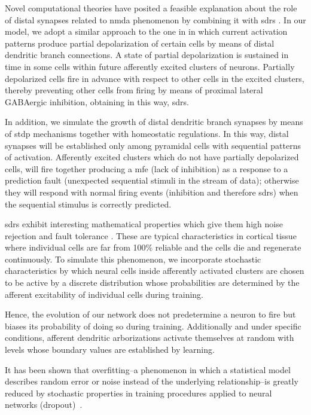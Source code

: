 {Novel computational theories have posited a feasible explanation about the role of distal synapses related to \gls{nmda}
phenomenon \cite{hawkins_2016} by combining it with \glspl{sdr} \cite{ahmad_2016}. In our model, we adopt a similar approach to the one in \cite{hawkins_2016} in which current activation patterns produce partial depolarization of certain cells by means of distal dendritic branch connections. A state of partial depolarization is sustained in time in some cells within
future afferently excited clusters of neurons. Partially depolarized cells fire in advance with respect to other cells in the excited clusters, thereby preventing other cells from firing by means of proximal lateral GABAergic inhibition, obtaining in this way, \glspl{sdr}.

In addition, we simulate the growth of distal dendritic branch synapses by means of \gls{stdp} mechanisms together with
homeostatic regulations. In this way, distal synapses will be established only among pyramidal cells with sequential patterns
of activation. Afferently excited clusters which do not have partially depolarized cells,
will fire together producing a \gls{mfe}
(lack of inhibition) as a response to a prediction fault (unexpected sequential stimuli in the stream of data); otherwise they will respond with normal firing events (inhibition and therefore \glspl{sdr}) when the sequential stimulus is
correctly predicted.

\glspl{sdr} exhibit interesting mathematical properties which give them high noise rejection and fault tolerance \cite{ahmad_2015}.
These are typical characteristics in cortical tissue where individual cells are far from 100\% reliable and the cells die and regenerate continuously. To simulate this phenomenon, we incorporate stochastic characteristics by which neural cells inside afferently activated clusters are chosen to be active by a discrete distribution whose probabilities are determined by the afferent excitability of individual cells during training.

Hence, the evolution of our network does not predetermine a neuron to fire but biases its probability of doing so during training. Additionally and under specific conditions, afferent dendritic arborizations activate themselves at random with levels whose boundary values are established by learning. 

It has been shown that overfitting--a phenomenon in which a statistical model describes random error or noise instead of the underlying relationship--is greatly reduced by stochastic properties in training procedures applied to neural networks (dropout)~\cite{JMLR:v15:srivastava14a}.

}
